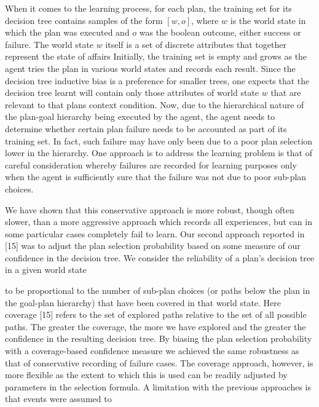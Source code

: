 When it comes to the learning process, for each plan, the training set for its decision tree contains samples of the form $[w, o]$, where $w$ is the world state in which the plan was executed and $o$ was the boolean outcome, either success or failure. The world state $w$ itself is a set of discrete attributes that together represent the state of affairs Initially, the training set is empty and grows as the agent tries the plan in various world states and records each result. 
Since the decision tree inductive bias is a preference for smaller trees, one expects that the decision tree learnt will contain only those attributes of world state $w$ that are relevant to that plans context condition.
Now, due to the hierarchical nature of the plan-goal hierarchy being executed by the agent, the agent needs to determine whether certain plan failure needs to be accounted as part of its training set. In fact, such failure may have only been due to a poor plan selection lower in the hierarchy.
One approach is to address the learning problem is that of careful consideration whereby failures are recorded for learning purposes only when the agent is sufficiently sure that the failure was not due to poor sub-plan choices.


We have shown that this conservative approach is more robust, though often
slower, than a more aggressive approach which records all experiences, but
can in some particular cases completely fail to learn.
Our second approach reported in [15] was to adjust the plan selection
probability based on some measure of our conﬁdence in the decision tree.
We consider the reliability of a plan’s decision tree in a given world state
  
to be proportional to the number of sub-plan choices (or paths below the
plan in the goal-plan hierarchy) that have been covered in that world state.
Here coverage [15] refers to the set of explored paths relative to the set of
all possible paths. The greater the coverage, the more we have explored and
the greater the conﬁdence in the resulting decision tree. By biasing the plan
selection probability with a coverage-based conﬁdence measure we achieved
the same robustness as that of conservative recording of failure cases. The
coverage approach, however, is more ﬂexible as the extent to which this is
used can be readily adjusted by parameters in the selection formula.
A limitation with the previous approaches is that events were assumed to


